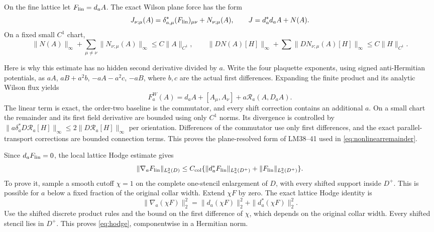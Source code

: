 \documentclass[11pt,letterpaper]{article}
\numberwithin{equation}{section}
\theoremstyle{plain}
\theoremstyle{remark}
\begin{document}
On the fine lattice let $F_{\rm lin}=d_aA$. The exact Wilson plane force has
the form
\begin{equation}
 J_{\nu;\mu}(A)=\delta^*_{a,\mu}(F_{\rm lin})_{\mu\nu}
                   +N_{\nu;\mu}(A),
 \qquad J=d_a^*d_aA+N(A).
 \label{eq:planeforce}
\end{equation}
On a fixed small $C^1$ chart,
\begin{equation}
 \|N(A)\|_\infty+\sum_{\mu\ne\nu}\|N_{\nu;\mu}(A)\|_\infty
 \le C\|A\|_{C^1},\qquad
 \|DN(A)[H]\|_\infty+\sum\|DN_{\nu;\mu}(A)[H]\|_\infty
 \le C\|H\|_{C^1}.
 \label{eq:nonlinearremainder}
\end{equation}

Here is why this estimate has no hidden second derivative divided by $a$.
Write the four plaquette exponents, using signed anti-Hermitian potentials, as
$aA$, $aB+a^2b$, $-aA-a^2c$, $-aB$, where $b,c$ are the actual first differences.
Expanding the finite product and its analytic Wilson flux yields
\[
 F_a^W(A)=d_aA+[A_\mu,A_\nu]+a\mathcal R_a(A,D_aA).
\]
The linear term is exact, the order-two baseline is the commutator, and every
shift correction contains an additional $a$. On a small chart the remainder
and its first field derivative are bounded using only $C^1$ norms. Its
divergence is controlled by
$\|a\delta_a^*D\mathcal R_a[H]\|_\infty\le2\|D\mathcal R_a[H]\|_\infty$
per orientation. Differences of the commutator use only first differences,
and the exact parallel-transport corrections are bounded connection terms.
This proves the plane-resolved form of LM38--41 used in
\eqref{eq:nonlinearremainder}.

Since $d_aF_{\rm lin}=0$, the local lattice Hodge estimate gives
\begin{equation}
 \|\nabla_aF_{\rm lin}\|_{L^2_a(D)}
 \le C_{\rm col}\{\|d_a^*F_{\rm lin}\|_{L^2_a(D^+)}
                         +\|F_{\rm lin}\|_{L^2_a(D^+)}\}.
 \label{eq:hodge}
\end{equation}
To prove it, sample a smooth cutoff $\chi=1$ on the complete one-stencil
enlargement of $D$, with every shifted support inside $D^+$. This is possible
for $a$ below a fixed fraction of the original collar width. Extend $\chi F$
by zero. The exact lattice Hodge identity is
\[
 \|\nabla_a(\chi F)\|_2^2
 =\|d_a(\chi F)\|_2^2+\|d_a^*(\chi F)\|_2^2.
\]
Use the shifted discrete product rules and the bound on the first difference
of $\chi$, which depends on the original collar width. Every shifted stencil
lies in $D^+$. This proves \eqref{eq:hodge}, componentwise in a Hermitian norm.
\end{document}
